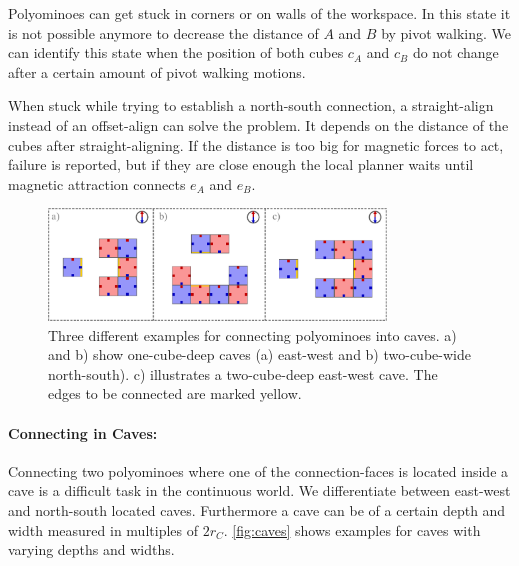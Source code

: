Polyominoes can get stuck in corners or on walls of the workspace.
In this state it is not possible anymore to decrease the distance of $A$ and $B$ by pivot walking.
We can identify this state when the position of both cubes $c_A$ and $c_B$ do not change after a certain amount of pivot walking motions.

When stuck while trying to establish a north-south connection, a straight-align instead of an offset-align can solve the problem.
It depends on the distance of the cubes after straight-aligning.
If the distance is too big for magnetic forces to act, failure is reported, but if they are close enough the local planner waits until magnetic attraction connects $e_A$ and $e_B$.


\begin{figure}
	\centering
	\includegraphics[width=0.80\textwidth]{figures/caves.pdf}
	\caption[Examples for connecting polyominoes into caves]{Three different examples for connecting polyominoes into caves. a) and b) show one-cube-deep caves (a) east-west and b) two-cube-wide north-south). c) illustrates a two-cube-deep east-west cave. The edges to be connected are marked yellow.}
	\label{fig:caves}
\end{figure}


\paragraph{Connecting in Caves:}

Connecting two polyominoes where one of the connection-faces is located inside a cave is a difficult task in the continuous world.
We differentiate between east-west and north-south located caves.
Furthermore a cave can be of a certain depth and width measured in multiples of $2 r_C$.
\autoref{fig:caves} shows examples for caves with varying depths and widths.

